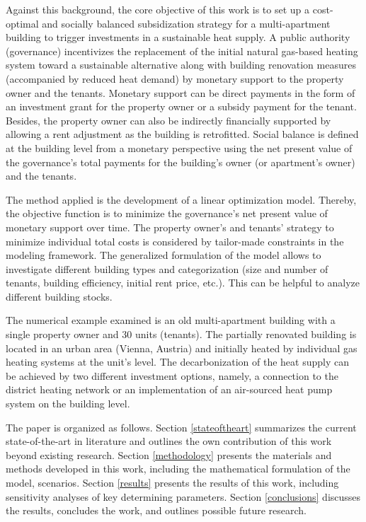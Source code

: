 Against this background, the core objective of this work is to set up a cost-optimal and socially balanced subsidization strategy for a multi-apartment building to trigger investments in a sustainable heat supply. A public authority (governance) incentivizes the replacement of the initial natural gas-based heating system toward a sustainable alternative along with building renovation measures (accompanied by reduced heat demand) by monetary support to the property owner and the tenants. Monetary support can be direct payments in the form of an investment grant for the property owner or a subsidy payment for the tenant. Besides, the property owner can also be indirectly financially supported by allowing a rent adjustment as the building is retrofitted. Social balance is defined at the building level from a monetary perspective using the net present value of the governance's total payments for the building's owner (or apartment's owner) and the tenants.\vspace{0.5cm}

The method applied is the development of a linear optimization model. Thereby, the objective function is to minimize the governance's net present value of monetary support over time. The property owner's and tenants' strategy to minimize individual total costs is considered by tailor-made constraints in the modeling framework. The generalized formulation of the model allows to investigate different building types and categorization (size and number of tenants, building efficiency, initial rent price, etc.). This can be helpful to analyze different building stocks.\vspace{0.5cm}

The numerical example examined is an old multi-apartment building with a single property owner and 30 units (tenants). The partially renovated building is located in an urban area (Vienna, Austria) and initially heated by individual gas heating systems at the unit's level. The decarbonization of the heat supply can be achieved by two different investment options, namely, a connection to the district heating network or an implementation of an air-sourced heat pump system on the building level.\vspace{0.5cm}

The paper is organized as follows. Section \ref{stateoftheart} summarizes the current state-of-the-art in literature and outlines the own contribution of this work beyond existing research. Section \ref{methodology} presents the materials and methods developed in this work, including the mathematical formulation of the model,  scenarios. Section \ref{results} presents the results of this work, including sensitivity analyses of key determining parameters. Section \ref{conclusions} discusses the results, concludes the work, and outlines possible future research.